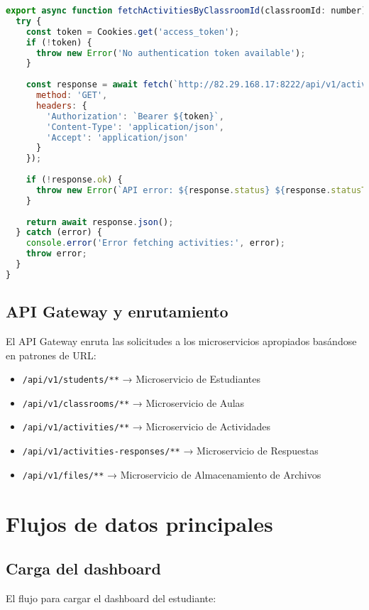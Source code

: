 \documentclass[12pt,a4paper]{report}
\begin{document}
\begin{lstlisting}[language=JavaScript, caption=Ejemplo de función API en el frontend]
export async function fetchActivitiesByClassroomId(classroomId: number) {
  try {
    const token = Cookies.get('access_token');
    if (!token) {
      throw new Error('No authentication token available');
    }
    
    const response = await fetch(`http://82.29.168.17:8222/api/v1/activities/classrooms/${classroomId}`, {
      method: 'GET',
      headers: {
        'Authorization': `Bearer ${token}`,
        'Content-Type': 'application/json',
        'Accept': 'application/json'
      }
    });
    
    if (!response.ok) {
      throw new Error(`API error: ${response.status} ${response.statusText}`);
    }
    
    return await response.json();
  } catch (error) {
    console.error('Error fetching activities:', error);
    throw error;
  }
}
\end{lstlisting}

\subsection{API Gateway y enrutamiento}
El API Gateway enruta las solicitudes a los microservicios apropiados basándose en patrones de URL:

\begin{itemize}
    \item \texttt{/api/v1/students/**} → Microservicio de Estudiantes
    \item \texttt{/api/v1/classrooms/**} → Microservicio de Aulas
    \item \texttt{/api/v1/activities/**} → Microservicio de Actividades
    \item \texttt{/api/v1/activities-responses/**} → Microservicio de Respuestas
    \item \texttt{/api/v1/files/**} → Microservicio de Almacenamiento de Archivos
\end{itemize}

\section{Flujos de datos principales}
\subsection{Carga del dashboard}
El flujo para cargar el dashboard del estudiante:
\end{document}
